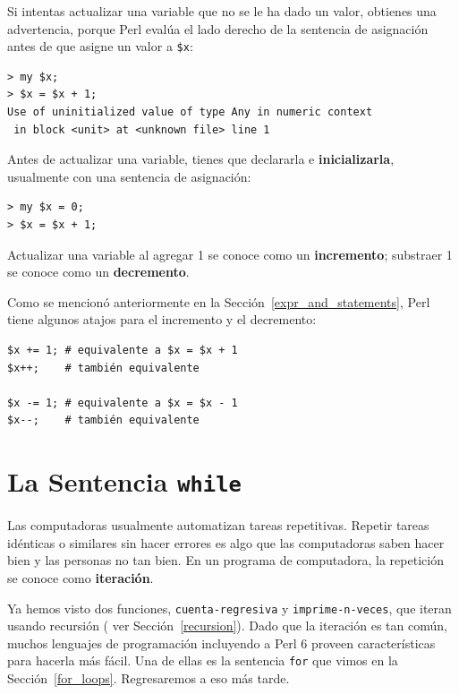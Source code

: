 Si intentas actualizar una variable que no se le ha dado un valor,
obtienes una advertencia, porque Perl evalúa el lado derecho de la 
sentencia de asignación antes de que asigne un valor a {\tt \$x}:

\begin{lstlisting}
> my $x;
> $x = $x + 1;
Use of uninitialized value of type Any in numeric context 
 in block <unit> at <unknown file> line 1
\end{lstlisting}
%
Antes de actualizar una variable, tienes que declararla 
e {\bf inicializarla}, usualmente con una sentencia de asignación:

\begin{lstlisting}
> my $x = 0;
> $x = $x + 1;
\end{lstlisting}
%
Actualizar una variable al agregar 1 se conoce como un {\bf incremento};
substraer 1 se conoce como un {\bf decremento}.

Como se mencionó anteriormente en la Sección~\ref{expr_and_statements},
Perl tiene algunos atajos para el incremento y el decremento:

\begin{lstlisting}
$x += 1; # equivalente a $x = $x + 1
$x++;    # también equivalente 

$x -= 1; # equivalente a $x = $x - 1
$x--;    # también equivalente 
\end{lstlisting}

\section{La Sentencia {\tt while}}

Las computadoras usualmente automatizan tareas repetitivas.
Repetir tareas idénticas o similares sin hacer errores es algo que las computadoras saben hacer bien y las personas
no tan bien. En un programa de computadora, la repetición se
conoce como {\bf iteración}.

Ya hemos visto dos funciones, {\tt cuenta-regresiva} 
y \verb|imprime-n-veces|, que iteran usando recursión (
ver Sección~\ref{recursion}). Dado que la iteración es tan
común, muchos lenguajes de programación incluyendo a Perl 6
proveen características para hacerla más fácil. Una de ellas es la sentencia {\tt for} que vimos en la Sección~\ref{for_loops}. Regresaremos a eso más tarde.

